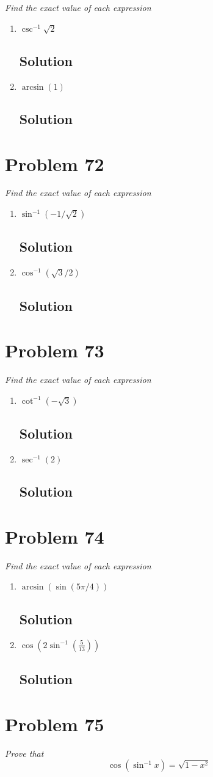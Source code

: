 \documentclass[11pt]{article}
\newcommand{\soln}{\subsection*}
\newcommand{\qn}{\textit}
\begin{document}
\qn{Find the exact value of each expression}
\begin{enumerate}
	\item \qn{$\csc^{-1}\sqrt{2}$}
	\soln{Solution}
	
	\item \qn{$\arcsin(1)$}
	\soln{Solution}
\end{enumerate}

\section*{Problem 72}

\qn{Find the exact value of each expression}
\begin{enumerate}
	\item \qn{$\sin^{-1}(-1/\sqrt{2})$}
	\soln{Solution}
	
	\item \qn{$\cos^{-1}(\sqrt{3}/2)$}
	\soln{Solution}
\end{enumerate}

\section*{Problem 73}

\qn{Find the exact value of each expression}
\begin{enumerate}
	\item \qn{$\cot^{-1}(-\sqrt{3})$}
	\soln{Solution}
	
	\item \qn{$\sec^{-1}(2)$}
	\soln{Solution}
\end{enumerate}

\section*{Problem 74}

\qn{Find the exact value of each expression}
\begin{enumerate}
	\item \qn{$\arcsin(\sin(5\pi/4))$}
	\soln{Solution}
	
	\item \qn{$\cos(2\sin^{-1}(\frac{5}{13}))$}
	\soln{Solution}
\end{enumerate}

\section*{Problem 75}

\qn{Prove that $$\cos(\sin^{-1}x)=\sqrt{1-x^2}$$}
\end{document}
